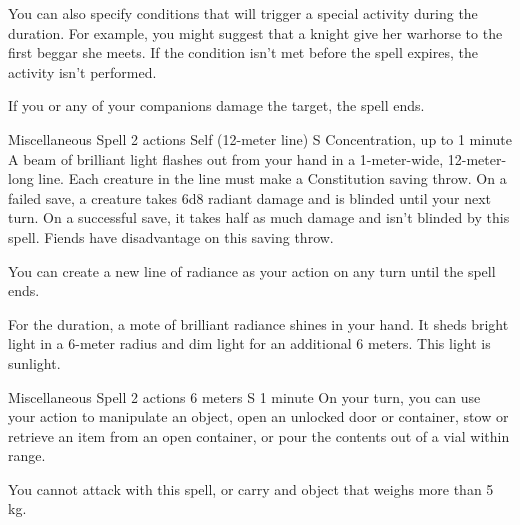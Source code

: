     You can also specify conditions that will trigger a special activity during the duration.
    For example, you might suggest that a knight give her warhorse to the first beggar she meets.
    If the condition isn't met before the spell expires, the activity isn't performed.

    If you or any of your companions damage the target, the spell ends.

    {Miscellaneous Spell}
    {2 actions}
    {Self (12-meter line)}
    {S}
    {Concentration, up to 1 minute}
    A beam of brilliant light flashes out from your hand in a 1-meter-wide, 12-meter-long line.
    Each creature in the line must make a Constitution saving throw.
    On a failed save, a creature takes 6d8 radiant damage and is blinded until your next turn.
    On a successful save, it takes half as much damage and isn't blinded by this spell.
    Fiends have disadvantage on this saving throw.

    You can create a new line of radiance as your action on any turn until the spell ends.

    For the duration, a mote of brilliant radiance shines in your hand.
    It sheds bright light in a 6-meter radius and dim light for an additional 6 meters.
    This light is sunlight.

    {Miscellaneous Spell}
    {2 actions}
    {6 meters}
    {S}
    {1 minute}
    On your turn, you can use your action to manipulate an object, open an unlocked door or container, stow or retrieve an item from an open container, or pour the contents out of a vial within range.

    You cannot attack with this spell, or carry and object that weighs more than 5 kg.
